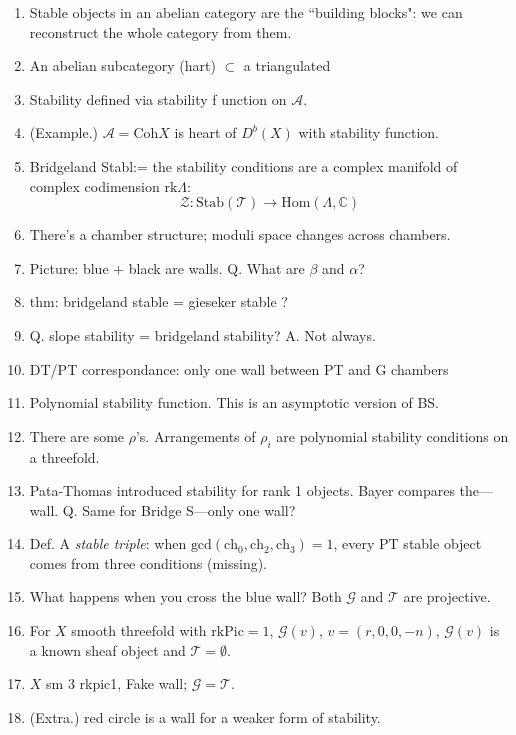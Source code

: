 \begin{enumerate}
\item Stable objects in an abelian category
are the ``building blocks":
we can reconstruct the whole category from
them.
\item  An abelian subcategory (hart)
$\subset$ a
triangulated
\item Stability defined via stability f
unction on $\mathcal{A}$.
\item (Example.) $\mathcal{A}=\text{Coh}X$ is
heart
of $D^b(X)$ with stability function.
\item Bridgeland Stabl:= the stability
conditions are a complex manifold
of complex codimension $\text{rk}\Lambda$:
$$
\mathcal{Z}:\text{Stab}(\mathcal{T})
\longrightarrow
\text{Hom}(\Lambda,\mathbb{C})
$$
\item There's a chamber structure;
moduli space changes across chambers.
\item Picture: blue + black are walls.
Q. What are $\beta$ and $\alpha$?
\item thm: bridgeland stable
= gieseker stable ?
\item Q. slope stability
= bridgeland stability?
A. Not always.
\item DT/PT correspondance:
only one wall between PT and G chambers
\medskip
\item Polynomial stability function.
This is an asymptotic version of BS.
\item There are some $\rho$'s.
Arrangements of $\rho_i$ are polynomial
stability conditions on a threefold.
\item Pata-Thomas introduced stability
for rank 1 objects.
Bayer compares the---wall. Q.
Same for Bridge S---only one wall?
\medskip
\item Def. A {\it stable triple}: when
$\text{gcd}(\text{ch}_0,\text{ch}_2,\text{ch}
_3)=1$,
every PT stable object
comes from three conditions (missing).
\item What happens when
you cross the blue wall?
Both $\mathcal{G}$ and $\mathcal{T}$ are
projective.
\medskip
\item For $X$ smooth threefold with
$\text{rk}\text{Pic}=1$, $\mathcal{G}(v)$,
$v=(r,0,0,-n)$, $\mathcal{G}(v)$ is a known
sheaf object and
$\mathcal{T}=\emptyset$.
\item $X$ sm 3 rkpic1, Fake wall;
$\mathcal{G}=\mathcal{T}$.
\item (Extra.) red circle is a wall for a
weaker form of stability.
\end{enumerate}

